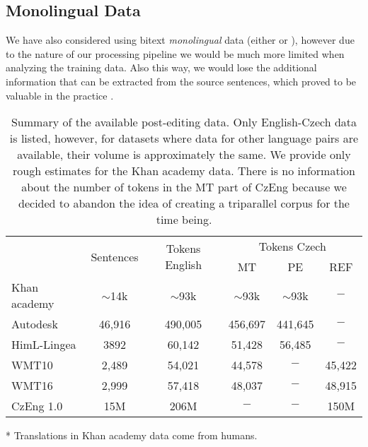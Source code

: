 \subsection{Monolingual Data}

We have also considered using bitext \emph{monolingual} data (either 
or ), however due to the nature of our processing
pipeline we would be much more limited when analyzing the training data. Also this way, we would
lose the additional information that can be extracted from the source sentences, which proved to be valuable in the practice \citep{biblio:RoMaDEPFIXA2012}.


\begin{table*}[t]
\centering
\small

\begin{threeparttable}
\begin{tabular}{|l|c|c|c|c|c|}
\hline
\multirow{2}{*}{}  &  \multirow{2}{*}{\hash{} Sentences}  &  \multirow{2}{*}{\hash{} Tokens English}  &  \multicolumn{3}{c|}{\hash{} Tokens Czech}  \\
\cline{4-6}
&  &  & MT & PE & REF \\
\hline
Khan academy & $\sim$14k & $\sim$93k & $\sim$93k\tnote{*} & $\sim$93k & $-$ \\
\hline
Autodesk & 46,916 & 490,005 & 456,697 & 441,645 & $-$ \\
\hline
HimL-Lingea & 3892 & 60,142 & 51,428 & 56,485 & $-$ \\
\hline
WMT10 & 2,489 & 54,021 & 44,578 & $-$ & 45,422 \\
\hline
WMT16 & 2,999 & 57,418 & 48,037 & $-$ & 48,915 \\
\hline
CzEng 1.0 & 15M & 206M & $-$ & $-$ & 150M \\
\hline
\end{tabular}
\begin{tablenotes}
\item[*] Translations in Khan academy data come from humans.
\end{tablenotes}
\end{threeparttable}
\caption[Summary of the available data]{Summary of the available post-editing data. Only English-Czech data is listed, however, for datasets
where data for other language pairs are available, their volume is approximately the same. We provide only rough estimates for the Khan academy data.
There is no information about the number of tokens in the MT part of CzEng because we decided to abandon the
idea of creating a triparallel corpus for the time being.
}
\label{avail-data}
\end{table*}

